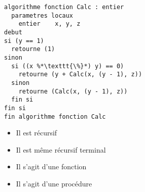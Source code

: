 \documentclass[11pt,a4paper]{article}
\begin{document}

\begin{table}[!ht]
  \centering
  \begin{minipage}{0.59\textwidth}
    \centering

\begin{lstlisting}[style=algorithmique]
algorithme fonction Calc : entier
  parametres locaux
    entier    x, y, z
debut
si (y == 1)
  retourne (1)
sinon
  si ((x %*\texttt{\%}*) y) == 0)
    retourne (y + Calc(x, (y - 1), z))
  sinon
    retourne (Calc(x, (y - 1), z))
  fin si
fin si
fin algorithme fonction Calc \end{lstlisting}

\begin{itemize}
  \item[\checkmark] Il est récursif  \phantom{lfg}\\
  \item[\CaseCoche] Il est même récursif terminal  \phantom{lfg}\\
  \item[\checkmark] Il s'agit d'une fonction  \phantom{lfg}\\
  \item[\CaseCoche] Il s'agit d'une procédure  \phantom{lfg}\\
\end{itemize}


  \end{minipage}
  \hfillx
  \begin{minipage}{0.4\textwidth}
    \centering


\end{minipage}
\end{table}
\end{document}
